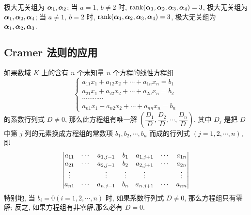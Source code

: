 \begin{solution}
\begin{enumerate}[label=(\arabic{*})]
              极大无关组为 $\vb*{\alpha}_1,\vb*{\alpha}_2$;
              当 $a=1,~b\neq 2$ 时, $\rank(\vb*{\alpha}_1,\vb*{\alpha}_2,\vb*{\alpha}_3,\vb*{\alpha}_4)=3$, 极大无关组为 $\vb*{\alpha}_1,\vb*{\alpha}_2,\vb*{\alpha}_4$;
              当 $a\neq 1,~b=2$ 时, $\rank(\vb*{\alpha}_1,\vb*{\alpha}_2,\vb*{\alpha}_3,\vb*{\alpha}_4)=3$, 极大无关组为 $\vb*{\alpha}_1,\vb*{\alpha}_2,\vb*{\alpha}_3$.
    \end{enumerate}
\end{solution}

\subsection{Cramer 法则的应用}

\begin{theorem}[Cramer 法则]
    如果数域 $ K $ 上的含有 $ n $ 个末知量 $ n $ 个方程的线性方程组
    $$\begin{cases}
            a_{11} x_{1}+a_{12} x_{2}+\cdots+a_{1 n} x_{n}=b_{1} \\
            a_{21} x_{1}+a_{22} x_{2}+\cdots+a_{2 n} x_{n}=b_{2} \\
            \cdots \cdots \cdots \cdots                          \\
            a_{n 1} x_{1}+a_{n 2} x_{2}+\cdots+a_{n n} x_{n}=b_{n}
        \end{cases}$$
    的系数行列式 $ D \neq 0$, 那么此方程组有唯一解 $ \left(\dfrac{D_{1}}{D}, \dfrac{D_{2}}{D}, \cdots, \dfrac{D_{n}}{D}\right)$, 
    其中 $ D_{j} $ 是把 $ D $ 中第 $ j $ 列的元素换成方程组的常数项 $ b_{1}, b_{2}, \cdots, b_{n} $ 而成的行列式 $ (j=1,2, \cdots, n)$, 即
    $$\mqty|a_{11}  & \cdots & a_{1, j-1} & b_{1}  & a_{1, j+1} & \cdots & a_{1 n} \\
        a_{21}  & \cdots & a_{2, j-1} & b_{2}  & a_{2, j+1} & \cdots & a_{2 n} \\
        \vdots  &        & \vdots     & \vdots & \vdots     &        & \vdots  \\
        a_{n 1} & \cdots & a_{n, j-1} & b_{n}  & a_{n, j+1} & \cdots & a_{n n}|$$
    特别地, 当 $ b_{i}=0(i=1,2, \cdots, n) $ 时, 如果系数行列式 $ D \neq 0 $, 那么方程组只有零解;
    反之, 如果方程组有非零解,那么必有 $ D=0 .$
\end{theorem}


